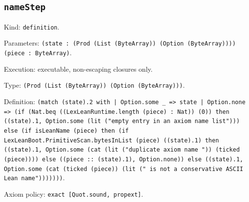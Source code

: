 \documentclass[11pt]{article}
\begin{document}
\subsection*{\texttt{nameStep}}
\noindent Kind: \texttt{definition}.\par
\noindent Parameters: \texttt{(state : (Prod (List (ByteArray)) (Option (ByteArray)))) (piece : ByteArray)}.\par
\noindent Execution: executable, non-escaping closures only.\par
\noindent Type: \texttt{(Prod (List (ByteArray)) (Option (ByteArray)))}.\par
\noindent Definition: \texttt{(match (state).2 with | Option.some \_ => state | Option.none => (if (Nat.beq ((LexLeanRuntime.length (piece) : Nat)) (0)) then ((state).1, Option.some (lit ("empty entry in an axiom name list"))) else (if isLeanName (piece) then (if LexLeanBoot.PrimitiveScan.bytesInList (piece) ((state).1) then ((state).1, Option.some (cat (lit ("duplicate axiom name ")) (ticked (piece)))) else ((piece :: (state).1), Option.none)) else ((state).1, Option.some (cat (ticked (piece)) (lit (" is not a conservative ASCII Lean name")))))))}.\par
\noindent Axiom policy: \texttt{exact [Quot.sound, propext]}.\par
\end{document}
